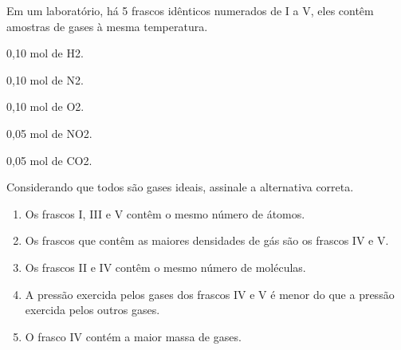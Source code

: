 Em um laboratório, há 5 frascos idênticos numerados de I a V, eles contêm amostras de gases à mesma temperatura.

\begin{enumerate*}[label =  \Roman*:]
	\item 0,10 mol de H2.
	\item 0,10 mol de N2.
	\item 0,10 mol de O2.
	\item 0,05 mol de NO2.
	\item 0,05 mol de CO2.
\end{enumerate*}

Considerando que todos são gases ideais, assinale a alternativa correta.

\begin{enumerate}[label = (\scalealph{\alph*})]
	\item Os frascos I, III e V contêm o mesmo número de átomos. 
	\item Os frascos que contêm as maiores densidades de gás são os frascos IV e V. 
	\item Os frascos II e IV contêm o mesmo número de moléculas. 
	\item A pressão exercida pelos gases dos frascos IV e V é menor do que a pressão exercida pelos outros gases. 
	\item  O frasco IV contém a maior massa de gases.
\end{enumerate}
